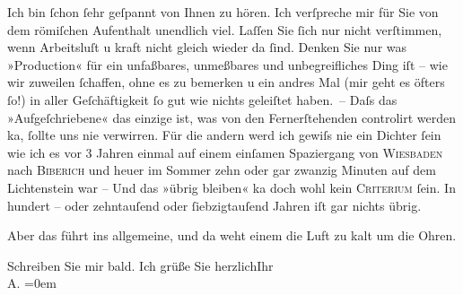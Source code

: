 \pstart
           Ich bin ſchon ſehr geſpannt von Ihnen zu hören. Ich verſpreche mir für Sie von dem
                  römiſchen Aufenthalt unendlich viel. Laſſen
               Sie ſich nur nicht verſtimmen, wenn {\pb}Arbeitsluſt u kraft
               nicht gleich wieder da ſind. Denken Sie nur was »Production« für ein unfaßbares,
               unmeßbares und unbegreifliches Ding iſt – wie wir zuweilen ſchaffen, ohne es zu
               bemerken u ein andres Mal (mir geht es öfters ſo!) in aller Geſchäftigkeit ſo gut wie
               nichts geleiſtet haben. – Daſs das »Aufgeſchriebene« das einzige ist, was von den
               Fernerſtehenden controlirt werden ka{\geminationn}, ſollte uns nie
               verwirren. Für die {\pb}andern werd ich gewiſs nie ein
               Dichter ſein wie ich es vor 3 Jahren einmal auf einem einſamen Spaziergang von \textsc{Wiesbaden} nach \textsc{Biberich} und heuer im Sommer zehn oder gar zwanzig Minuten auf dem Lichtenstein war – Und das »übrig bleiben« ka{\geminationn} doch wohl kein \textsc{Criterium}{ }ſein. In hundert – oder zehntauſend oder
               ſiebzigtauſend Jahren iſt gar nichts {\pb}übrig.\pend
           
\pstart
           Aber das führt ins allgemeine, und da weht einem die Luft zu kalt um die Ohren.\pend
           
\pstart
           Schreiben Sie mir bald. Ich grüße Sie herzlich\hspace*{1.5em}Ihr{\\[\baselineskip]}\spacefill\mbox{A.}\pend
           \leftskip=0em{}\endnumbering{}  
      